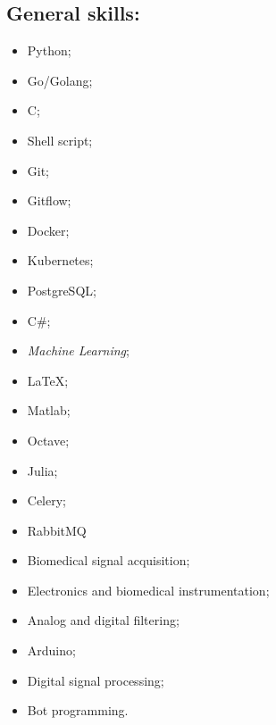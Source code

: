 \documentclass[11pt]{article}
\begin{document}
\subsection{General skills:}
\begin{multicols}{3} %
    \begin{itemize}
        \item Python;
        \item Go/Golang;
        \item C;
        \item Shell script;
        \item Git;
        \item Gitflow;
        \item Docker;
        \item Kubernetes;
        \item PostgreSQL;
        \item C\#;
        \item \textit{Machine Learning};
        \item \LaTeX ;
        \item Matlab;
        \item Octave;
        \item Julia;
        \item Celery;
        \item RabbitMQ
        \item Biomedical signal acquisition;
        \item Electronics and biomedical instrumentation;
        \item Analog and digital filtering;
        \item Arduino;
        \item Digital signal processing;
        \item Bot programming.
    \end{itemize}
\end{multicols}
\end{document}
